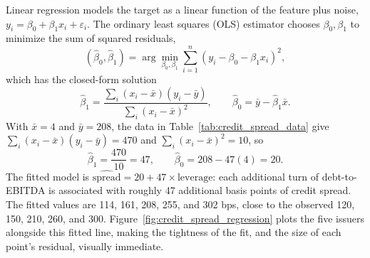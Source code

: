 \documentclass[../ai_in_finance]{subfiles}
\begin{document}
Linear regression models the target as a linear function of the feature plus noise, $y_i = \beta_0 + \beta_1 x_i + \varepsilon_i$. The ordinary least squares (OLS) estimator chooses $\beta_0, \beta_1$ to minimize the sum of squared residuals,
\begin{equation*}
(\hat\beta_0, \hat\beta_1) = \arg\min_{\beta_0,\beta_1} \sum_{i=1}^n \left(y_i - \beta_0 - \beta_1 x_i\right)^2,
\end{equation*}
which has the closed-form solution
\begin{equation*}
\hat\beta_1 = \frac{\sum_i (x_i - \bar x)(y_i - \bar y)}{\sum_i (x_i - \bar x)^2}, \qquad \hat\beta_0 = \bar y - \hat\beta_1 \bar x.
\end{equation*}
With $\bar x = 4$ and $\bar y = 208$, the data in Table~\ref{tab:credit_spread_data} give $\sum_i (x_i-\bar x)(y_i - \bar y) = 470$ and $\sum_i (x_i - \bar x)^2 = 10$, so
\begin{equation*}
\hat\beta_1 = \frac{470}{10} = 47, \qquad \hat\beta_0 = 208 - 47(4) = 20.
\end{equation*}
The fitted model is $\widehat{\text{spread}} = 20 + 47 \times \text{leverage}$: each additional turn of debt-to-EBITDA is associated with roughly 47 additional basis points of credit spread. The fitted values are 114, 161, 208, 255, and 302 bps, close to the observed 120, 150, 210, 260, and 300. Figure~\ref{fig:credit_spread_regression} plots the five issuers alongside this fitted line, making the tightness of the fit, and the size of each point's residual, visually immediate.
\end{document}
